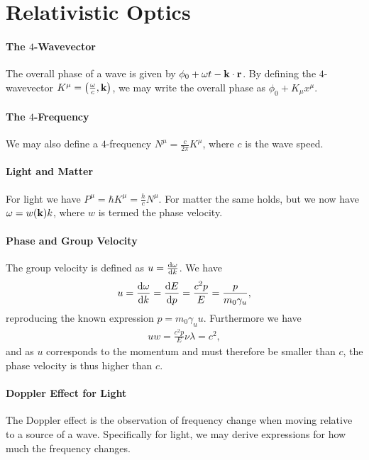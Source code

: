 \section{Relativistic Optics}

\paragraph{The $4$-Wavevector}
The overall phase of a wave is given by $\phi_{0} + \omega t - \vb{k}\cdot\vb{r}$. By defining the $4$-wavevector $K^{\mu} = \left(\frac{\omega}{c}, \vb{k}\right)$, we may write the overall phase as $\phi_{0} + K_{\mu}x^{\mu}$.

\paragraph{The $4$-Frequency}
We may also define a $4$-frequency $N^{\mu} = \frac{c}{2\pi}K^{\mu}$, where $c$ is the wave speed.

\paragraph{Light and Matter}
For light we have $P^{\mu} = \hbar K^{\mu} = \frac{h}{c}N^{\mu}$. For matter the same holds, but we now have $\omega = w(\vb{k})k$, where $w$ is termed the phase velocity.

\paragraph{Phase and Group Velocity}
The group velocity is defined as $u = \dv{\omega}{k}$. We have
\begin{align*}
	u = \dv{\omega}{k} = \dv{E}{p} = \frac{c^{2}p}{E} = \frac{p}{m_{0}\gamma_{u}},
\end{align*}
reproducing the known expression $p = m_{0}\gamma_{u}u$. Furthermore we have
\begin{align*}
	uw = \frac{c^{2}p}{E}\nu\lambda = c^{2},
\end{align*}
and as $u$ corresponds to the momentum and must therefore be smaller than $c$, the phase velocity is thus higher than $c$.

\paragraph{Doppler Effect for Light}
The Doppler effect is the observation of frequency change when moving relative to a source of a wave. Specifically for light, we may derive expressions for how much the frequency changes.


